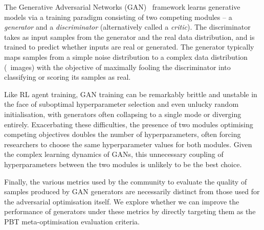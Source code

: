 The Generative Adversarial Networks (GAN)~\citep{goodfellowgan} framework
learns generative models via a training paradigm consisting of two competing modules --
a \emph{generator} and a \emph{discriminator} (alternatively called a \emph{critic}).
The discriminator takes as input samples from the generator and the real data distribution,
and is trained to predict whether inputs are real or generated.
The generator typically maps samples from a simple noise distribution to a complex data distribution (\eg~images) with the objective of maximally fooling the discriminator into classifying or scoring its samples as real.

Like RL agent training, GAN training can be remarkably brittle and unstable in the face of suboptimal hyperparameter selection and even unlucky random initialisation,
with generators often collapsing to a single mode or diverging entirely.
%
Exacerbating these difficulties, the presence of two modules optimising competing objectives doubles the number of hyperparameters,
often forcing researchers to choose the same hyperparameter values for both modules.
Given the complex learning dynamics of GANs,
this unnecessary coupling of hyperparameters between the two modules is unlikely to be the best choice.

Finally, the various metrics used by the community to evaluate the quality of samples
produced by GAN generators are necessarily distinct from those used for the adversarial optimisation itself.
We explore whether we can improve the performance of generators under these metrics by directly targeting them
as the PBT meta-optimisation evaluation criteria.

